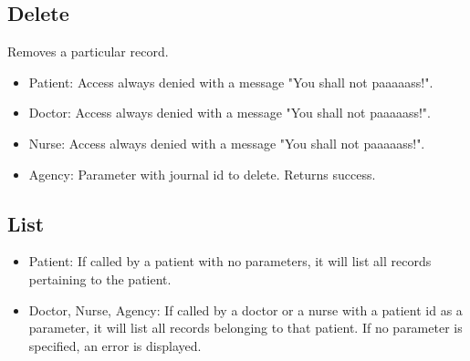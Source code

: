 \documentclass[10pt, a4paper]{article}
\begin{document}
\subsection{Delete}
Removes a particular record.
\begin{itemize}
\item Patient: Access always denied with a message "You shall not paaaaass!".
\item Doctor: Access always denied with a message "You shall not paaaaass!".
\item Nurse: Access always denied with a message "You shall not paaaaass!".
\item Agency: Parameter with journal id to delete. Returns success.
\end{itemize}

\subsection{List}
\begin{itemize}
\item Patient: If called by a patient with no parameters, it will list all records pertaining to the patient.
\item Doctor, Nurse, Agency: If called by a doctor or a nurse with a patient id as a parameter, it will list all records belonging to that patient. If no parameter is specified, an error is displayed.
\end{itemize}

\end{document}
